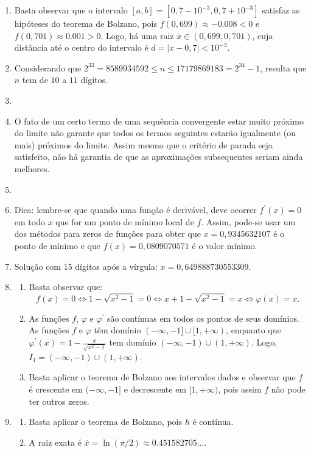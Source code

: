 \documentclass[12pt,a4paper]{article}
\begin{document}
\begin{enumerate}
\item Basta observar que o intervalo $[a,b] = [0,7-10^{-3}, 0,7+10^{-3}]$ satisfaz as hipóteses do teorema de Bolzano, pois $f(0,699) \approx -0.008 < 0$ e $f(0,701) \approx 0.001 > 0$. Logo, há uma raiz $\overline{x} \in (0,699, 0,701)$, cuja distância até o centro do intervalo é $d = |\overline{x} - 0,7| < 10^{-3}$.
\item Considerando que $2^{33} = 8589934592 \leq n \leq 17179869183 = 2^{34}-1$, resulta que $n$ tem de $10$ a $11$ dígitos.
\item 
\item O fato de um certo termo de uma sequência convergente estar muito próximo do limite não garante que todos os termos seguintes estarão igualmente (ou mais) próximos do limite. Assim mesmo que o critério de parada seja satisfeito, não há garantia de que as aproximações subsequentes seriam ainda melhores.
\item
\item Dica: lembre-se que quando uma função é derivável, deve ocorrer $f^\prime(x) = 0$ em todo $x$ que for um ponto de mínimo local de $f$. Assim, pode-se usar um dos métodos para zeros de funções para obter que $x = 0,9345632107$ é o ponto de mínimo e que $f(x) = 0,0809070571$ é o valor mínimo.
\item Solução com 15 dígitos após a vírgula: $x = 0,649888730553309$.
\item
\begin{enumerate}
\item Basta observar que:
\[
f(x) = 0
\Leftrightarrow
1 - \sqrt{x^2 - 1} = 0
\Leftrightarrow
x + 1 - \sqrt{x^2 - 1} = x
\Leftrightarrow
\varphi(x) = x.
\]
\item As funções $f$, $\varphi$ e $\varphi^\prime$ são contínuas em todos os pontos de seus domínios. As funções $f$ e $\varphi$ têm domínio $(-\infty, -1] \cup [1, +\infty)$, enquanto que $\varphi^\prime(x) = 1 - \frac{x}{\sqrt{x^2 - 1}}$ tem domínio $(-\infty, -1) \cup (1, +\infty)$. Logo, $I_1 = (-\infty, -1) \cup (1, +\infty)$.
\item Basta aplicar o teorema de Bolzano aos intervalos dados e observar que $f$ é crescente em $(-\infty, -1]$ e decrescente em $[1, +\infty)$, pois assim $f$ não pode ter outros zeros.
\end{enumerate}
\item \begin{enumerate}
\item Basta aplicar o teorema de Bolzano, pois $h$ é contínua.
\item A raiz exata é $\overline{x} = \ln(\pi/2) \approx 0.451582705\ldots$.
\end{enumerate}
\end{enumerate}
\end{document}
